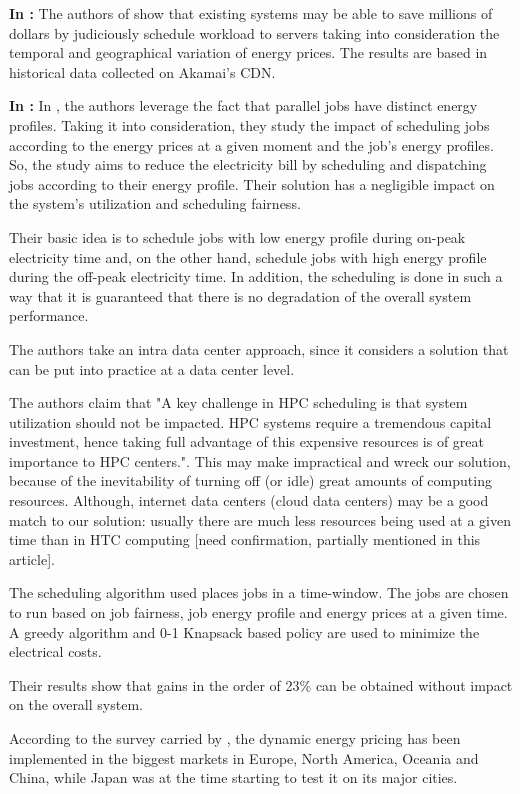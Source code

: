 \textbf{In \cite{CUTTING_BILL}:}
The authors of \cite{CUTTING_BILL} show that existing systems may be able to
save millions of dollars by judiciously schedule workload to servers taking into
consideration the temporal and geographical variation of energy prices. The
results are based in historical data collected on Akamai's CDN. 


\textbf{In \cite{DYN_PRICING_HPC}:}
In \cite{DYN_PRICING_HPC}, the authors leverage the fact that parallel jobs have 
distinct energy profiles. Taking it into consideration, they study the impact of
scheduling jobs according to the energy prices at a given moment and the job's
energy profiles. So, the study aims to reduce the electricity bill by scheduling and
dispatching jobs according to their energy profile. Their solution has a
negligible impact on the system's utilization and scheduling fairness. 

Their basic idea is to schedule jobs with low energy profile during on-peak
electricity time and, on the other hand, schedule jobs with high energy profile
during the off-peak electricity time. In addition, the scheduling is done in
such a way that it is guaranteed that there is no degradation of the overall
system performance. 

The authors take an intra data center approach, since it considers a solution
that can be put into practice at a data center level.

The authors claim that "A key challenge in HPC scheduling is that system 
utilization should not be impacted. HPC systems require a tremendous capital 
investment, hence taking full advantage of this expensive resources is of great 
importance to HPC centers.". This may make impractical and wreck our solution,
because of the inevitability of turning off (or idle) great amounts of computing 
resources. Although, internet data centers (cloud data centers)  may be a good 
match to our solution: usually there are much less resources being used at a given 
time than in HTC computing [need confirmation, partially mentioned in this article].

The scheduling algorithm used places jobs in a time-window. The jobs are chosen
to run based on job fairness, job energy profile and energy prices at a given
time. A greedy algorithm and 0-1 Knapsack based policy are used to minimize the
electrical costs.

Their results show that gains in the order of 23\% can be obtained without
impact on the overall system. 

According to the survey carried by \cite{DYN_PRICING_HPC}, the dynamic energy
pricing has been implemented in the biggest markets in Europe, North America,
Oceania and China, while Japan was at the time starting to test it on its major
cities.

